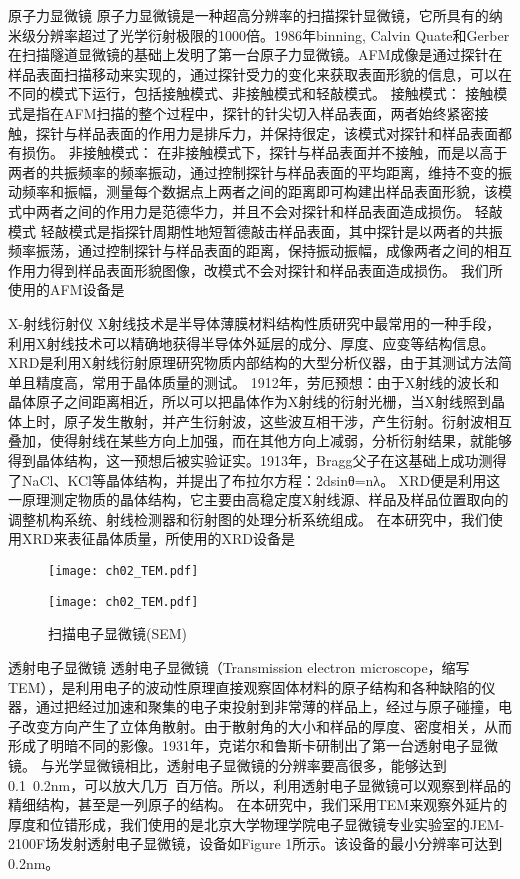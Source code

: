 {\hei 原子力显微镜}
原子力显微镜是一种超高分辨率的扫描探针显微镜，它所具有的纳米级分辨率超过了光学衍射极限的1000倍。1986年binning, Calvin Quate和Gerber在扫描隧道显微镜的基础上发明了第一台原子力显微镜。AFM成像是通过探针在样品表面扫描移动来实现的，通过探针受力的变化来获取表面形貌的信息，可以在不同的模式下运行，包括接触模式、非接触模式和轻敲模式。
接触模式：
接触模式是指在AFM扫描的整个过程中，探针的针尖切入样品表面，两者始终紧密接触，探针与样品表面的作用力是排斥力，并保持很定，该模式对探针和样品表面都有损伤。
非接触模式：
在非接触模式下，探针与样品表面并不接触，而是以高于两者的共振频率的频率振动，通过控制探针与样品表面的平均距离，维持不变的振动频率和振幅，测量每个数据点上两者之间的距离即可构建出样品表面形貌，该模式中两者之间的作用力是范德华力，并且不会对探针和样品表面造成损伤。
轻敲模式
轻敲模式是指探针周期性地短暂德敲击样品表面，其中探针是以两者的共振频率振荡，通过控制探针与样品表面的距离，保持振动振幅，成像两者之间的相互作用力得到样品表面形貌图像，改模式不会对探针和样品表面造成损伤。
我们所使用的AFM设备是

{\hei X-射线衍射仪}
X射线技术是半导体薄膜材料结构性质研究中最常用的一种手段，利用X射线技术可以精确地获得半导体外延层的成分、厚度、应变等结构信息。XRD是利用X射线衍射原理研究物质内部结构的大型分析仪器，由于其测试方法简单且精度高，常用于晶体质量的测试。
1912年，劳厄预想：由于X射线的波长和晶体原子之间距离相近，所以可以把晶体作为X射线的衍射光栅，当X射线照到晶体上时，原子发生散射，并产生衍射波，这些波互相干涉，产生衍射。衍射波相互叠加，使得射线在某些方向上加强，而在其他方向上减弱，分析衍射结果，就能够得到晶体结构，这一预想后被实验证实。1913年，Bragg父子在这基础上成功测得了NaCl、KCl等晶体结构，并提出了布拉尔方程：2dsinθ=nλ。
XRD便是利用这一原理测定物质的晶体结构，它主要由高稳定度X射线源、样品及样品位置取向的调整机构系统、射线检测器和衍射图的处理分析系统组成。
在本研究中，我们使用XRD来表征晶体质量，所使用的XRD设备是


\begin {figure}
	\begin{minipage}[t]{0.45\linewidth}
		\centering
		\texttt{[image: ch02\_TEM.pdf]}
		\caption{透射电子显微镜(TEM)}
		\label{fig:TEM}
	\end{minipage}%
	\begin{minipage}[t]{0.45\linewidth}
		\centering
		\texttt{[image: ch02\_TEM.pdf]}
		\caption{扫描电子显微镜(SEM)}
		\label{fig:SEM}
	\end{minipage}
\end{figure}


{\hei 透射电子显微镜}
透射电子显微镜（Transmission electron microscope，缩写TEM），是利用电子的波动性原理直接观察固体材料的原子结构和各种缺陷的仪器，通过把经过加速和聚集的电子束投射到非常薄的样品上，经过与原子碰撞，电子改变方向产生了立体角散射。由于散射角的大小和样品的厚度、密度相关，从而形成了明暗不同的影像。1931年，克诺尔和鲁斯卡研制出了第一台透射电子显微镜。
与光学显微镜相比，透射电子显微镜的分辨率要高很多，能够达到0.1~0.2nm，可以放大几万~百万倍。所以，利用透射电子显微镜可以观察到样品的精细结构，甚至是一列原子的结构。
在本研究中，我们采用TEM来观察外延片的厚度和位错形成，我们使用的是北京大学物理学院电子显微镜专业实验室的JEM-2100F场发射透射电子显微镜，设备如Figure 1所示。该设备的最小分辨率可达到0.2nm。

